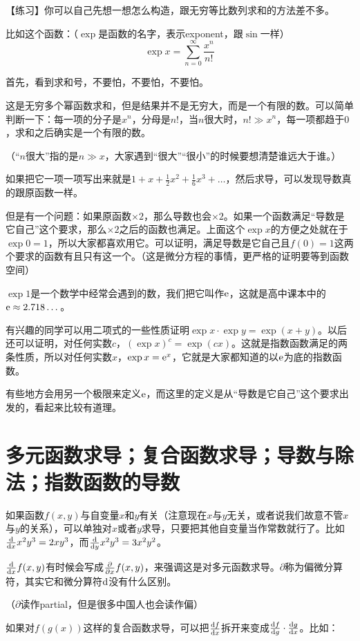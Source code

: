 【练习】你可以自己先想一想怎么构造，跟无穷等比数列求和的方法差不多。

比如这个函数：（$\exp$是函数的名字，表示exponent，跟$\sin$一样）
\begin{equation*}
\exp x=\sum_{n=0}^{\infty}\frac{x^n}{n!}
\end{equation*}

首先，看到求和号，不要怕，不要怕，不要怕。

这是无穷多个幂函数求和，但是结果并不是无穷大，而是一个有限的数。可以简单判断一下：每一项的分子是$x^n$，分母是$n!$，当$n$很大时，$n! \gg x^n$，每一项都趋于$0$，求和之后确实是一个有限的数。

（“$n$很大”指的是$n \gg x$，大家遇到“很大”“很小”的时候要想清楚谁远大于谁。）

如果把它一项一项写出来就是$1+x+\frac{1}{2}x^2+\frac{1}{6}x^3+\dots$，然后求导，可以发现导数真的跟原函数一样。

但是有一个问题：如果原函数$\times 2$，那么导数也会$\times 2$。如果一个函数满足“导数是它自己”这个要求，那么$\times 2$之后的函数也满足。上面这个$\exp x$的方便之处就在于$\exp 0=1$，所以大家都喜欢用它。可以证明，满足导数是它自己且$f(0)=1$这两个要求的函数有且只有这一个。（这是微分方程的事情，更严格的证明要等到函数空间）

$\exp 1$是一个数学中经常会遇到的数，我们把它叫作$\mathrm{e}$，这就是高中课本中的$\mathrm{e} \approx 2.718 \dots$。

有兴趣的同学可以用二项式的一些性质证明$\exp x \cdot \exp y=\exp(x+y)$。以后还可以证明，对任何实数$c$，$(\exp x)^c=\exp(c x)$。这就是指数函数满足的两条性质，所以对任何实数$x$，$\exp x=\mathrm{e}^x$，它就是大家都知道的以$\mathrm{e}$为底的指数函数。

有些地方会用另一个极限来定义$\mathrm{e}$，而这里的定义是从“导数是它自己”这个要求出发的，看起来比较有道理。
\section{多元函数求导；复合函数求导；导数与除法；指数函数的导数}
如果函数$f(x,y)$与自变量$x$和$y$有关（注意现在$x$与$y$无关，或者说我们故意不管$x$与$y$的关系），可以单独对$x$或者$y$求导，只要把其他自变量当作常数就行了。比如$\frac{\mathop{}\!\mathrm{d}}{\mathop{}\!\mathrm{d} x} x^2 y^3=2 x y^3$，而$\frac{\mathop{}\!\mathrm{d}}{\mathop{}\!\mathrm{d} y} x^2 y^3=3 x^2 y^2$。

$\frac{\mathop{}\!\mathrm{d}}{\mathop{}\!\mathrm{d} x} f(x,y)$有时候会写成$\frac{\partial}{\partial x} f(x,y)$，来强调这是对多元函数求导。$\partial$称为偏微分算符，其实它和微分算符$\mathop{}\!\mathrm{d}$没有什么区别。

（$\partial$读作partial，但是很多中国人也会读作偏）

如果对$f(g(x))$这样的复合函数求导，可以把$\frac{\mathop{}\!\mathrm{d} f}{\mathop{}\!\mathrm{d} x}$拆开来变成$\frac{\mathop{}\!\mathrm{d} f}{\mathop{}\!\mathrm{d} g} \cdot \frac{\mathop{}\!\mathrm{d} g}{\mathop{}\!\mathrm{d} x}$。比如：

